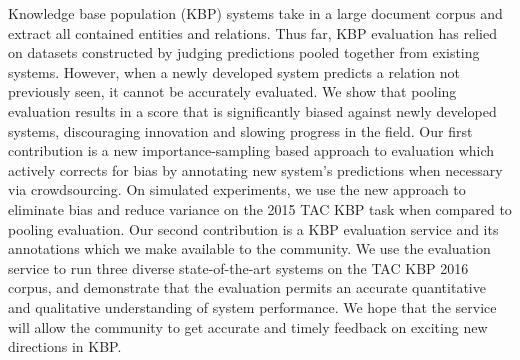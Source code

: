 Knowledge base population (KBP) systems take in a large document corpus and extract all contained entities and relations.
Thus far, KBP evaluation has relied on datasets constructed by judging predictions pooled together from existing systems. 
However, when a newly developed system predicts a relation not previously seen, it cannot be accurately evaluated. We show that pooling evaluation  results in a score that is significantly biased against newly developed systems, discouraging innovation and slowing progress in the field.
Our first contribution is a new importance-sampling based approach to evaluation which actively corrects for bias by annotating new system's predictions when necessary via crowdsourcing.
On simulated experiments, we use the new approach to eliminate bias and reduce variance on the 2015 TAC KBP task when compared to pooling evaluation.
Our second contribution is a KBP evaluation service and its annotations which we make available to the community. 
We use the evaluation service to run three diverse state-of-the-art systems on the TAC KBP 2016 corpus, and demonstrate that the evaluation permits an accurate quantitative and qualitative understanding of system performance.
We hope that the service will allow the community to get accurate and timely feedback on exciting new directions in KBP.\@


